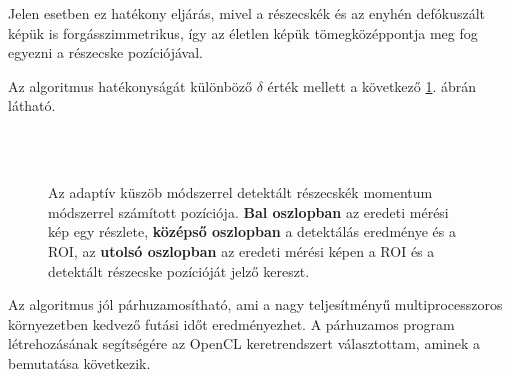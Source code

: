 	Jelen esetben ez hatékony eljárás, mivel a részecskék és az enyhén defókuszált képük is forgásszimmetrikus, így az életlen képük tömegközéppontja
	meg fog egyezni a részecske pozíciójával.
	
	\noindent Az algoritmus hatékonyságát különböző $\delta$ érték mellett a következő \ref{fig:roi}. ábrán látható.
	
	\begin{figure}[!ht]
		\centering
		\\
		\\
		\caption[Pozíciómérés momentum módszerrel]{Az adaptív küszöb módszerrel detektált részecskék
		momentum módszerrel számított pozíciója. \textbf{Bal oszlopban} az eredeti mérési kép egy részlete, \textbf{középső oszlopban} a
		detektálás eredménye és a ROI, az \textbf{utolsó oszlopban} az eredeti mérési képen a ROI és a detektált
		részecske pozícióját jelző kereszt.}
		\label{fig:roi}
	\end{figure}
	
	\noindent
	\begin{center}
	Az algoritmus jól párhuzamosítható, ami a nagy teljesítményű multiprocesszoros
	környezetben kedvező futási időt eredményezhet. A párhuzamos program létrehozásának segítségére az 
	OpenCL keretrendszert választottam, aminek a bemutatása következik.
	\end{center}





